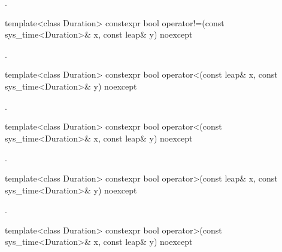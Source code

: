 \begin{itemdescr}
\pnum
\returns {}.
\end{itemdescr}

%
%
\begin{itemdecl}
template<class Duration>
  constexpr bool operator!=(const sys_time<Duration>& x, const leap& y) noexcept
\end{itemdecl}

\begin{itemdescr}
\pnum
\returns {}.
\end{itemdescr}

%
%
\begin{itemdecl}
template<class Duration>
  constexpr bool operator<(const leap& x, const sys_time<Duration>& y) noexcept
\end{itemdecl}

\begin{itemdescr}
\pnum
\returns {}.
\end{itemdescr}

%
%
\begin{itemdecl}
template<class Duration>
  constexpr bool operator<(const sys_time<Duration>& x, const leap& y) noexcept
\end{itemdecl}

\begin{itemdescr}
\pnum
\returns {}.
\end{itemdescr}

%
%
\begin{itemdecl}
template<class Duration>
  constexpr bool operator>(const leap& x, const sys_time<Duration>& y) noexcept
\end{itemdecl}

\begin{itemdescr}
\pnum
\returns {}.
\end{itemdescr}

%
%
\begin{itemdecl}
template<class Duration>
  constexpr bool operator>(const sys_time<Duration>& x, const leap& y) noexcept
\end{itemdecl}

